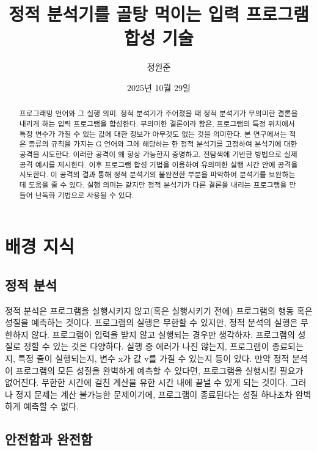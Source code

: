 \documentclass[ko]{snu-cse-bsc-thesis}
\title{정적 분석기를 골탕 먹이는 입력 프로그램 합성 기술}
\author{정원준}
\date{2025년 10월 29일}
\begin{document}
\maketitle

\begin{abstract}
프로그래밍 언어와 그 실행 의미, 정적 분석기가 주어졌을 때 정적 분석기가 무의미한 결론을 내리게 하는 입력 프로그램을 합성한다.
무의미한 결론이라 함은, 프로그램의 특정 위치에서 특정 변수가 가질 수 있는 값에 대한 정보가 아무것도 없는 것을 의미한다.
본 연구에서는 적은 종류의 규칙을 가지는 G 언어와 그에 해당하는 한 정적 분석기를 고정하여 분석기에 대한 공격을 시도한다.
이러한 공격이 왜 항상 가능한지 증명하고, 전탐색에 기반한 방법으로 실제 공격 예시를 제시한다.
이후 프로그램 합성 기법을 이용하여 유의미한 실행 시간 안에 공격을 시도한다. 
이 공격의 결과 통해 정적 분석기의 불완전한 부분을 파악하여 분석기를 보완하는데 도움을 줄 수 있다.
실행 의미는 같지만 정적 분석기가 다른 결론을 내리는 프로그램을 만들어 난독화 기법으로 사용될 수 있다.
\end{abstract}

\tableofcontents

\chapter{배경 지식}\label{chap:background}
\section{정적 분석}\label{sec:static_analysis}

정적 분석은 프로그램을 실행시키지 않고(혹은 실행시키기 전에) 프로그램의 행동 혹은 성질을 예측하는 것이다.
프로그램의 실행은 무한할 수 있지만, 정적 분석의 실행은 무한하지 않다.
프로그램이 입력을 받지 않고 실행되는 경우만 생각하자.
프로그램의 성질로 정할 수 있는 것은 다양하다. 
실행 중 에러가 나진 않는지, 프로그램이 종료되는지, 특정 줄이 실행되는지, 변수 x가 값 v를 가질 수 있는지 등이 있다.
만약 정적 분석이 프로그램의 모든 성질을 완벽하게 예측할 수 있다면, 프로그램을 실행시킬 필요가 없어진다. 
무한한 시간에 걸친 계산을 유한 시간 내에 끝낼 수 있게 되는 것이다.
그러나 정지 문제는 계산 불가능한 문제이기에, 프로그램이 종료된다는 성질 하나조차 완벽하게 예측할 수 없다.


\section{안전함과 완전함}\label{sec:soundness_completeness}
\end{document}
